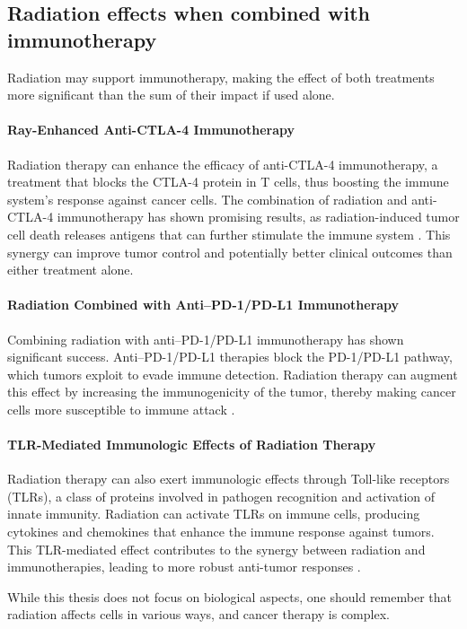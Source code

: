 \subsection{Radiation effects when combined with immunotherapy}
Radiation may support immunotherapy, making the effect of both treatments more significant than the sum of their impact if used alone.

\paragraph{Ray-Enhanced Anti-CTLA-4 Immunotherapy}
Radiation therapy can enhance the efficacy of anti-CTLA-4 immunotherapy, a treatment that blocks the CTLA-4 protein in T cells, thus boosting the immune system's response against cancer cells.
The combination of radiation and anti-CTLA-4 immunotherapy has shown promising results, as radiation-induced tumor cell death releases antigens that can further stimulate the immune system \cite{Vanpouillebox2015}.
This synergy can improve tumor control and potentially better clinical outcomes than either treatment alone.

\paragraph{Radiation Combined with Anti–PD-1/PD-L1 Immunotherapy}
Combining radiation with anti–PD-1/PD-L1 immunotherapy has shown significant success.
Anti–PD-1/PD-L1 therapies block the PD-1/PD-L1 pathway, which tumors exploit to evade immune detection.
Radiation therapy can augment this effect by increasing the immunogenicity of the tumor, thereby making cancer cells more susceptible to immune attack \cite{He2021}.

\paragraph{TLR-Mediated Immunologic Effects of Radiation Therapy}
Radiation therapy can also exert immunologic effects through Toll-like receptors (TLRs), a class of proteins involved in pathogen recognition and activation of innate immunity.
Radiation can activate TLRs on immune cells, producing cytokines and chemokines that enhance the immune response against tumors.
This TLR-mediated effect contributes to the synergy between radiation and immunotherapies, leading to more robust anti-tumor responses \cite{Walshan2020}.

While this thesis does not focus on biological aspects, one should remember that radiation affects cells in various ways, and cancer therapy is complex.

